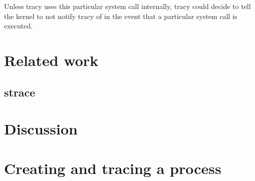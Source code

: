 \documentclass[a4paper, 10pt]{report}
\begin{document}
Unless tracy uses this particular system call internally, tracy could decide
to tell the kernel to not notify tracy of in the event that a particular
system call is executed.





\chapter{Related work}

\section{strace}



\chapter{Discussion}




\pagebreak

\appendix
\addappheadtotoc

\chapter{Creating and tracing a process}
\label{appendix:createtrace}
\end{document}
